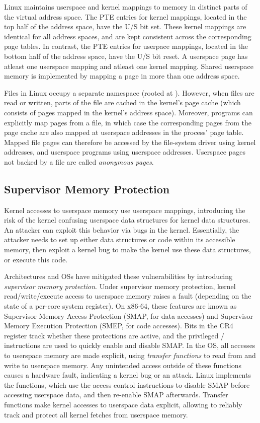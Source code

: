 \documentclass[letterpaper,twocolumn,10pt]{article}
\begin{document}
Linux maintains userspace and kernel mappings to memory in distinct
parts of the virtual address space.
The PTE entries for kernel mappings, located in the top half of the
address space, have the U/S bit set.
These kernel mappings are identical for all address spaces, and are
kept consistent across the corresponding page tables.
In contrast, the PTE entries for userpace mappings, located in the 
bottom half of the address space, have the U/S bit reset.
A userspace page has atleast one userspace mapping and atleast one
kernel mapping.
Shared userspace memory is implemented by mapping a page in more than
one address space.

Files in Linux occupy a separate namespace (rooted at \Code{/}).
However, when files are read or written, parts of the file are cached
in the kernel's page cache (which consists of pages mapped in the kernel's
address space).
Moreover, programs can explicitly map pages from a file, in which case
the corresponding pages from the page cache are also mapped at userspace
addresses in the process' page table.
Mapped file pages can therefore be accessed by the file-system driver using
kernel addresses, and userspace programs using userspace addresses.
Userspace pages not backed by a file are called \emph{anonymous pages}.


\subsection{Supervisor Memory Protection} %

Kernel accesses to userspace memory use userspace mappings, introducing
the risk of the kernel confusing userspace data structures
for kernel data structures.
An attacker can exploit this behavior via bugs in the
kernel.
Essentially, the attacker needs to set up either data structures
or code within its accessible memory, then exploit a kernel
bug to make the kernel use these data structures, or execute
this code.

Architectures and OSs have mitigated these vulnerabilities
by introducing \emph{supervisor memory protection}.
Under supervisor memory protection, kernel read/write/execute access to userspace memory
raises a fault (depending on the state of a per-core system
register).
On x86-64, these features are known as Supervisor Memory Access
Protection (SMAP, for data accesses) and Supervisor Memory Execution
Protection (SMEP, for code accesses). 
Bits in the CR4 register track whether these protections are active, 
and the privileged / instructions are used to 
quickly enable and disable SMAP.
In the OS, all accesses to userspace memory are made explicit,
using \emph{transfer functions} to read from and write to userspace memory.
Any unintended access outside of these functions causes a
hardware fault, indicating a kernel bug or an attack.
Linux implements the  functions, which
use the access control instructions to disable SMAP before
accessing userspace data, and then re-enable SMAP afterwards.  
Transfer functions make
kernel accesses to userspace data explicit, allowing
\midas to reliably track and protect all kernel fetches from userspace memory.
\end{document}
